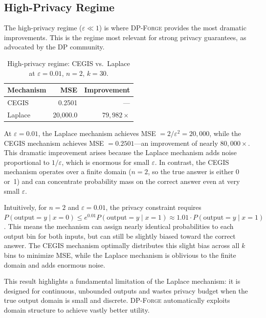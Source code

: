 \documentclass[11pt,a4paper]{article}
\newcommand{\dpforge}{\textsc{DP-Forge}}
\newcommand{\eps}{\varepsilon}
\begin{document}
\subsection{High-Privacy Regime}
\label{subsec:highprivacy}

The high-privacy regime ($\eps \ll 1$) is where \dpforge{} provides the most
dramatic improvements.  This is the regime most relevant for strong privacy
guarantees, as advocated by the DP community.

\begin{table}[t]
\centering
\caption{High-privacy regime: CEGIS vs.\ Laplace at $\eps = 0.01$, $n = 2$, $k = 30$.}
\label{tab:highprivacy}
\begin{tabular}{@{}lrr@{}}
\toprule
Mechanism & MSE & Improvement \\
\midrule
CEGIS     & 0.2501     & --- \\
Laplace   & 20{,}000.0 & $79{,}982\times$ \\
\bottomrule
\end{tabular}
\end{table}

At $\eps = 0.01$, the Laplace mechanism achieves MSE $= 2/\eps^2 = 20{,}000$,
while the CEGIS mechanism achieves MSE $= 0.2501$---an improvement of nearly
$80{,}000\times$.  This dramatic improvement arises because the Laplace mechanism
adds noise proportional to $1/\eps$, which is enormous for small $\eps$.  In
contrast, the CEGIS mechanism operates over a finite domain ($n = 2$, so the
true answer is either 0 or~1) and can concentrate probability mass on the
correct answer even at very small $\eps$.

Intuitively, for $n = 2$ and $\eps = 0.01$, the privacy constraint requires
$P(\text{output} = y \mid x = 0) \le e^{0.01} P(\text{output} = y \mid x = 1)
\approx 1.01 \cdot P(\text{output} = y \mid x = 1)$.
This means the mechanism can assign nearly identical probabilities to each output
bin for both inputs, but can still be slightly biased toward the correct answer.
The CEGIS mechanism optimally distributes this slight bias across all $k$ bins to
minimize MSE, while the Laplace mechanism is oblivious to the finite domain and
adds enormous noise.

This result highlights a fundamental limitation of the Laplace mechanism: it is
designed for continuous, unbounded outputs and wastes privacy budget when the
true output domain is small and discrete.  \dpforge{} automatically exploits
domain structure to achieve vastly better utility.
\end{document}
